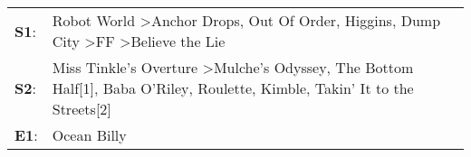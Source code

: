 \begin{supertabular}{p{0.03\textwidth}p{0.92\textwidth}}
 \textbf{S1}:  &                   Robot World\textsuperscript{} \textgreater \enspace Anchor Drops\textsuperscript{}, \enspace Out Of Order\textsuperscript{}, \enspace Higgins\textsuperscript{}, \enspace Dump City\textsuperscript{} \textgreater \enspace FF\textsuperscript{} \textgreater \enspace Believe the Lie\textsuperscript{}  \enspace  \\
 \textbf{S2}:  &  Miss Tinkle's Overture\textsuperscript{} \textgreater \enspace Mulche's Odyssey\textsuperscript{}, \enspace The Bottom Half[1]\textsuperscript{}, \enspace Baba O'Riley\textsuperscript{}, \enspace Roulette\textsuperscript{}, \enspace Kimble\textsuperscript{}, \enspace Takin' It to the Streets[2]\textsuperscript{}  \enspace  \\
 \textbf{E1}:  &                                                                                                                                                                                                                                                                                              Ocean Billy\textsuperscript{}  \enspace  \\
\end{supertabular}
